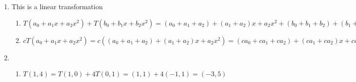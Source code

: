 \documentclass[12pt]{article}
\begin{document}
\begin{enumerate}
\begin{enumerate}
      \item $T(\bold{A}) + T(\bold{B})=\begin{bmatrix} 0 & 0 & 1\\ 0 & 1 & 0\\ 1 & 0 & 0\end{bmatrix}\bold{A}+\begin{bmatrix} 0 & 0 & 1\\ 0 & 1 & 0\\ 1 & 0 & 0\end{bmatrix}\bold{B}=\begin{bmatrix} 0 & 0 & 1\\ 0 & 1 & 0\\ 1 & 0 & 0\end{bmatrix}(\bold{A}+\bold{B})=T(\bold{A}+\bold{B})$ \textcolor{green}{\checkmark}

      \item $cT(\bold{A})=\begin{bmatrix}0&0&c\\0&c&0\\c&0&0\end{bmatrix}\bold{A}=T(c\bold{A})$ \textcolor{green}{\checkmark}

    \end{enumerate}

    \setcounter{enumi}{20}

  \item This is a linear transformation

    \begin{enumerate}

      \item $T(a_0+a_1x+a_2x^2) + T(b_0+b_1x+b_2x^2)=(a_0+a_1+a_2)+(a_1+a_2)x+a_2x^2+(b_0+b_1+b_2)+(b_1+b_2)x+b_2x^2=(a_0+b_0+a_1+b_1+a_2+b_2)+(a_1+b_1+a_2+b_2)x+(a_2+b_2)x^2=T((a_0+b_0)+(a_1+b_1)x+(a_2+b_2)x^2)$ \textcolor{green}{\checkmark}

      \item $cT(a_0+a_1x+a_2x^2)=c((a_0+a_1+a_2)+(a_1+a_2)x+a_2x^2)=(ca_0+ca_1+ca_2)+(ca_1+ca_2)x+ca_2x^2=T(ca_0+ca_1x+ca_2x^2)$ \textcolor{green}{\checkmark}

    \end{enumerate}

    \setcounter{enumi}{22}

  \item

    \begin{enumerate}

      \item $T(1,4)=T(1,0)+4T(0,1)=(1,1)+4(-1,1)=(-3,5)$


\end{enumerate}
\end{enumerate}
\end{document}

